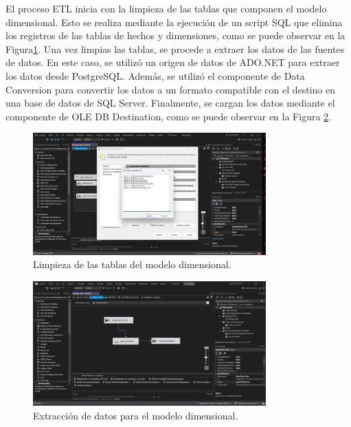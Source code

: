 El proceso ETL inicia con la limpieza de las tablas que componen el modelo dimensional. Esto se realiza mediante la ejecución de un
script SQL que elimina los registros de las tablas de hechos y dimensiones, como se puede observar en la Figura\ref{fig:limpieza-bi}.
Una vez limpias las tablas, se procede a extraer los datos de las fuentes de datos. En este caso, se utilizó un origen de datos de
ADO.NET para extraer los datos desde PostgreSQL. Además, se utilizó el componente de Data Conversion para convertir los datos a un
formato compatible con el destino en una base de datos de SQL Server. Finalmente, se cargan los datos mediante el componente de OLE
DB Destination, como se puede observar en la Figura \ref{fig:extraccion-bi}.

\begin{figure}[H]
    \centering
    \includegraphics[width=0.8\textwidth]{chapters/III-resultados-y-discusion/resources/images/limpieza-bi.png}
    \caption{Limpieza de las tablas del modelo dimensional.}
    \label{fig:limpieza-bi}
\end{figure}

\begin{figure}[H]
    \centering
    \includegraphics[width=0.8\textwidth]{chapters/III-resultados-y-discusion/resources/images/extraccion-bi.png}
    \caption{Extracción de datos para el modelo dimensional.}
    \label{fig:extraccion-bi}
\end{figure}

